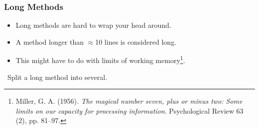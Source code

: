 \begin{frame}

\frametitle{Long Methods}

\begin{itemize}

\item Long methods are hard to wrap your head around.

\item A method longer than $\approx$10 lines is considered long.

\item This might have to do with limits of working memory\footnote{Miller, G.
A. (1956). \emph{The magical number seven, plus or minus two: Some limits on
our capacity for processing information}. Psychological Review 63 (2), pp.
81--97.}.

\end{itemize}

\vspace{\fill}

\begin{center}

\leftthumbsup~Split a long method into several.~\rightthumbsup

\end{center}

\vspace{\fill}

\end{frame}
